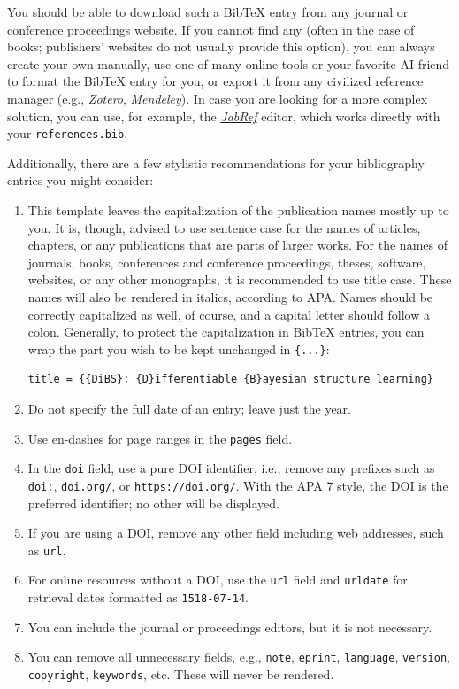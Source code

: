 You should be able to download such a Bib\TeX{} entry from any journal or conference proceedings website. If you
cannot find any (often in the case of books; publishers' websites do not usually provide this option), you can always
create your own manually, use one of many online tools or your favorite AI friend to format the Bib\TeX{}
entry for you, or export it from any civilized reference manager (e.g., \emph{Zotero}, \emph{Mendeley}).
In case you are looking for a more complex solution, you can use, for example, the
\emph{\href{https://jabref.org/}{JabRef}} editor, which works directly with your \verb|references.bib|.

Additionally, there are a few stylistic recommendations for your bibliography entries you might consider:
\begin{enumerate}
    \item This template leaves the capitalization of the publication names mostly up to you. It is, though, advised to
    use sentence case for the names of articles, chapters, or any publications that are parts of larger works. For the
    names of journals, books, conferences and conference proceedings, theses, software, websites, or any other
    monographs, it is recommended to use title case. These names will also be rendered in italics, according to APA.
    Names should be correctly capitalized as well, of course, and a capital letter should follow a colon.
    Generally, to protect the capitalization in Bib\TeX{} entries, you can wrap the part you wish to be kept unchanged
    in \verb|{...}|:
\begin{verbatim}
title = {{DiBS}: {D}ifferentiable {B}ayesian structure learning}
\end{verbatim}

    \item Do not specify the full date of an entry; leave just the year.
    \item Use en-dashes for page ranges in the \verb|pages| field.
    \item In the \verb|doi| field, use a pure DOI identifier, i.e., remove any prefixes such as \verb|doi:|,
    \verb|doi.org/|, or \verb|https://doi.org/|. With the APA 7 style, the DOI is the preferred identifier;
    no other will be displayed.
    \item If you are using a DOI, remove any other field including web addresses, such as \verb|url|.
    \item For online resources without a DOI, use the \verb|url| field and \verb|urldate| for retrieval dates
    formatted as \verb|1518-07-14|.
    \item You can include the journal or proceedings editors, but it is not necessary.
    \item You can remove all unnecessary fields, e.g., \verb|note|, \verb|eprint|, \verb|language|,
    \verb|version|, \verb|copyright|, \verb|keywords|, etc. These will never be rendered.
\end{enumerate}

